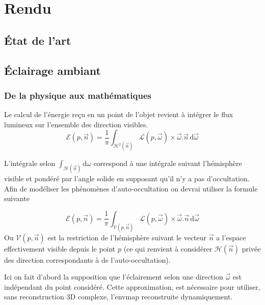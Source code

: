 \documentclass[10pt,a4paper,twoside, twocolumn]{report}
\begin{document}
\chapter{Rendu}


\section{État de l'art}


\section{Éclairage ambiant}

\subsection{De la physique aux mathématiques}
Le calcul de l'énergie reçu en un point de l'objet revient à intégrer le flux lumineux sur l'ensemble des direction visibles.
\begin{equation}
	\mathcal E(p, \vec n)=\frac{1}{\pi}\int_{\mathcal{H}^2(\vec{n})}\mathcal L(p,\vec\omega)\times\vec\omega.\vec n\, \mathrm d\vec\omega
\end{equation}

L'intégrale selon $\int_{\mathcal{H}(\vec n)}\mathrm d\omega$ correspond à une intégrale suivant l'hémisphère visible et pondéré par l'angle solide en supposant qu'il n'y a pas d'occultation. Afin de modéliser les phénomènes d'auto-occultation on devrai utiliser la formule suivante

\begin{equation}
	\mathcal E(p, \vec n)=\frac{1}{\pi}\int_{\mathcal V(p, \vec n )}\mathcal L(p, \vec\omega)\times\vec\omega.\vec n\, \mathrm d\vec\omega
\end{equation}
Ou $\mathcal V(p, \vec n)$ est la restriction de l'hémisphère suivant le vecteur $\vec n$ a l'espace effectivement visible depuis le point $p$ (ce qui renvient à considérer $\mathcal H(\vec n)$ privée des direction correspondants à de l'auto-occultation).

Ici on fait d'abord la supposition que l'éclairement selon une direction $\vec{\omega}$ est indépendant du point considéré. Cette approximation, est nécessaire pour utiliser, sans reconstruction 3D complexe, l'envmap reconstruite dynamiquement.
\end{document}
